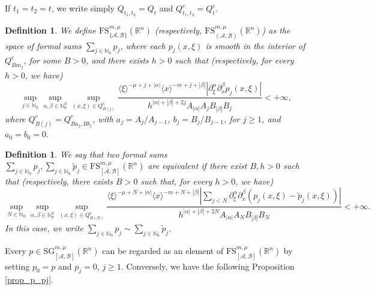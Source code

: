 \documentclass[11pt,reqno]{amsart}
\numberwithin{equation}{section}
\newtheorem{definition}[theorem]{Definition}
\newcommand{\R}{{\mathbb{R}}} %
\newcommand{\N}{{\mathbb{N}}} %
\newcommand{\SG}{{\mathrm{SG}}}
\newcommand{\FS}{{\mathrm{FS}}}
\newcommand{\A}{{\mathcal{A}}} %
\newcommand{\B}{{\mathcal{B}}} %
\begin{document}
If $t_1=t_2=t$, we write simply $Q_{t_1,t_2}=Q_t$ and $Q_{t_1,t_2}^c = Q_t^c$.


\begin{definition}
	We define $\FS_{\{\A,\B\}}^{m,\mu}(\R^n)$ (respectively, $\FS_{(\A,\B)}^{m,\mu}(\R^n)$) as the space of formal sums $\sum_{j\in\N_0}p_j$, where each $p_j(x,\xi)$ is smooth in the interior of $Q_{Bm_j}^c$, for some $B>0$, and there exists $h>0$ such that (respectively, for every $h>0$, we have)
	\begin{equation*}
		\sup_{j\in\N_0}\sup_{\alpha,\beta\in\N_0^n}\sup_{(x,\xi)\in Q_{B(j)}^c} \frac{\langle\xi\rangle^{-\mu+j+|\alpha|}\langle x\rangle^{-m+j+|\beta|}|\partial_\xi^\alpha\partial_x^\beta p_j(x,\xi)|}{h^{|\alpha|+|\beta|+2j} A_{|\alpha|}A_jB_{|\beta|}B_j} < +\infty,
	\end{equation*}
	where $Q_{B(j)}^c = Q_{Ba_j,Bb_j}^c$, with $a_j=A_j/A_{j-1}$, $b_j=B_j/B_{j-1}$, for $j\geq 1$, and $a_0=b_0=0$.
\end{definition}


\begin{definition}\label{def_equiv_FS}
	We say that two formal sums $\sum_{j\in\N_0}p_j, \sum_{j\in\N_0}\tilde{p}_j \in \FS_{[\A,\B]}^{m,\mu}(\R^n)$ are equivalent if there exist $B,h>0$ such that (respectively, there exists $B>0$ such that, for every $h>0$, we have)
	\begin{equation*}
		\sup_{N\in\N_0}\sup_{\alpha,\beta\in\N_0^n}\sup_{(x,\xi)\in Q_{B(N)}^c} \frac{\langle\xi\rangle^{-\mu+N+|\alpha|}\langle x\rangle^{-m+N+|\beta|} \left| \sum_{j<N}\partial_\xi^\alpha\partial_x^\beta(p_j(x,\xi)-\tilde{p}_j(x,\xi))\right|}{h^{|\alpha|+|\beta|+2N} A_{|\alpha|}A_NB_{|\beta|}B_N} < +\infty.
	\end{equation*}
	In this case, we write $\sum_{j\in\N_0}p_j\sim\sum_{j\in\N_0}\tilde{p}_j$.
\end{definition}


Every $p\in {\SG}_{[\A,\B]}^{m,\mu}(\R^n)$ can be regarded as an element of $\FS_{[\A,\B]}^{m,\mu}(\R^n)$ by setting 
$p_0=p$ and $p_j=0$, $j\geq 1$. Conversely, we have the following Proposition \ref{prop_p_pj}.
\end{document}
